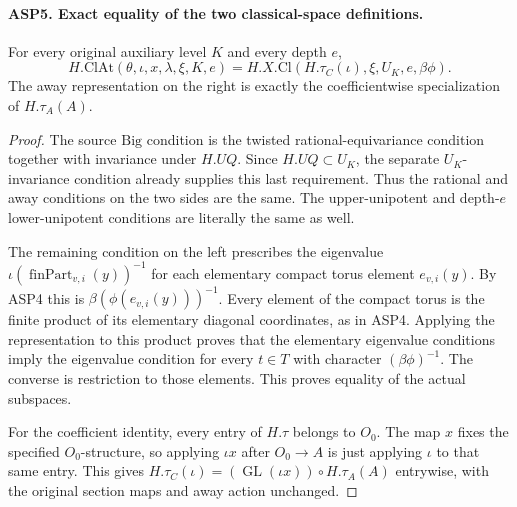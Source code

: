 \paragraph{ASP5. Exact equality of the two classical-space definitions.}
\label{claim:ASP5}
For every original auxiliary level $K$ and every
depth $e$,
\begin{equation}\label{eq:asp-classical}
 H.\mathrm{ClAt}(\theta,\iota,x,\lambda,\xi,K,e)
    =H.X.\mathrm{Cl}(H.\tau_C(\iota),\xi,U_K,e,\beta\phi).
\end{equation}
The away representation on the right is exactly
the coefficientwise specialization of $H.\tau_A(A)$.
\begin{proof}
The source $\mathrm{Big}$ condition is the
twisted rational-equivariance condition together
with invariance under $H.UQ$.  Since
$H.UQ\subset U_K$, the separate $U_K$-invariance
condition already supplies this last requirement.
Thus the rational and away conditions on the two
sides are the same.  The upper-unipotent and
depth-$e$ lower-unipotent conditions are literally
the same as well.

The remaining condition on the left prescribes
the eigenvalue
$\iota(\operatorname{finPart}_{v,i}(y))^{-1}$
for each elementary compact torus element
$e_{v,i}(y)$.  By ASP4 this is
$\beta(\phi(e_{v,i}(y)))^{-1}$.
Every element of the compact torus is the finite
product of its elementary diagonal coordinates,
as in ASP4.  Applying the representation to this
product proves that the elementary eigenvalue
conditions imply the eigenvalue condition for
every $t\in T$ with character $(\beta\phi)^{-1}$.
The converse is restriction to those elements.
This proves equality of the actual subspaces.

For the coefficient identity, every entry of
$H.\tau$ belongs to $O_0$.  The map $x$ fixes
the specified $O_0$-structure, so applying
$\iota x$ after $O_0\to A$ is just applying
$\iota$ to that same entry.  This gives
$H.\tau_C(\iota)=(\operatorname{GL}(\iota x))
\circ H.\tau_A(A)$ entrywise, with the original
section maps and away action unchanged.
\end{proof}

